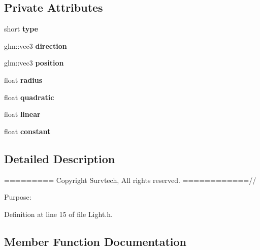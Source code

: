 \subsection*{Private Attributes}
\begin{DoxyCompactItemize}
\item 
short {\bfseries type}\hypertarget{class_light_ae3821bfa500ab56404411a8476549eca}{}\label{class_light_ae3821bfa500ab56404411a8476549eca}

\item 
glm\+::vec3 {\bfseries direction}\hypertarget{class_light_a494230a45b5cfa2f9fb54dbd4de3812b}{}\label{class_light_a494230a45b5cfa2f9fb54dbd4de3812b}

\item 
glm\+::vec3 {\bfseries position}\hypertarget{class_light_a89bffe071ec6431a21c5b54021fe08d6}{}\label{class_light_a89bffe071ec6431a21c5b54021fe08d6}

\item 
float {\bfseries radius}\hypertarget{class_light_ab9a87981b02f4612c872c49efa6b6e53}{}\label{class_light_ab9a87981b02f4612c872c49efa6b6e53}

\item 
float {\bfseries quadratic}\hypertarget{class_light_a0427bec0c2333a5dd9a18b2c282d952e}{}\label{class_light_a0427bec0c2333a5dd9a18b2c282d952e}

\item 
float {\bfseries linear}\hypertarget{class_light_a9d89a84a196a1329cda29df47a937e28}{}\label{class_light_a9d89a84a196a1329cda29df47a937e28}

\item 
float {\bfseries constant}\hypertarget{class_light_a3e211778e131611d35039827f36f51e5}{}\label{class_light_a3e211778e131611d35039827f36f51e5}

\end{DoxyCompactItemize}


\subsection{Detailed Description}
========= Copyright Survtech, All rights reserved. ============//

Purpose\+: 

 

Definition at line 15 of file Light.\+h.



\subsection{Member Function Documentation}
